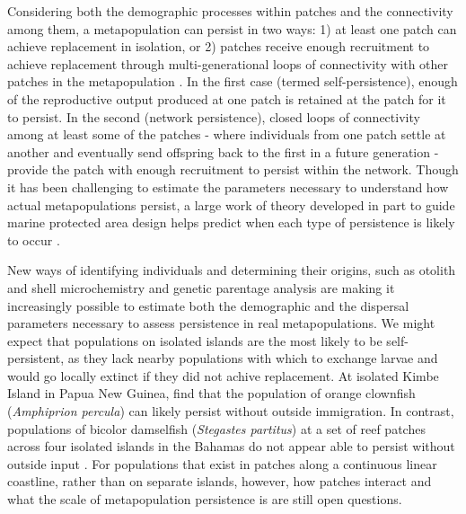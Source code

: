 \documentclass[12pt, oneside]{article}   	%
\begin{document}
Considering both the demographic processes within patches and the connectivity among them, a metapopulation can persist in two ways: 1) at least one patch can achieve replacement in isolation, or 2) patches receive enough recruitment to achieve replacement through multi-generational loops of connectivity with other patches in the metapopulation \citep{hastings_persistence_2006, burgess2014beyond}. In the first case (termed self-persistence), enough of the reproductive output produced at one patch is retained at the patch for it to persist. In the second (network persistence), closed loops of connectivity among at least some of the patches - where individuals from one patch settle at another and eventually send offspring back to the first in a future generation - provide the patch with enough recruitment to persist within the network. Though it has been challenging to estimate the parameters necessary to understand how actual metapopulations persist, a large work of theory developed in part to guide marine protected area design helps predict when each type of persistence is likely to occur \citep[i.e., large patches relative to the mean dispersal distance are likely to be self-persistent,][]{botsford_dependence_2001}. %

New ways of identifying individuals and determining their origins, such as otolith and shell microchemistry and genetic parentage analysis \citep[e.g.][]{wang2004sibship, wang2014estimation} are making it increasingly possible to estimate both the demographic \citep[e.g.][]{carson2011evaluating, hameed2016inverse} and the dispersal \citep[e.g.][]{almany2017larval, daloia_self-recruitment_2013} parameters necessary to assess persistence in real metapopulations. We might expect that populations on isolated islands are the most likely to be self-persistent, as they lack nearby populations with which to exchange larvae and would go locally extinct if they did not achive replacement. At isolated Kimbe Island in Papua New Guinea, \cite{salles_coral_2015} find that the population of orange clownfish (\textit{Amphiprion percula}) can likely persist without outside immigration. In contrast, populations of bicolor damselfish (\textit{Stegastes partitus}) at a set of reef patches across four isolated islands in the Bahamas do not appear able to persist without outside input \citep{johnson2018integrating}. For populations that exist in patches along a continuous linear coastline, rather than on separate islands, however, how patches interact and what the scale of metapopulation persistence is are still open questions. %
\end{document}
